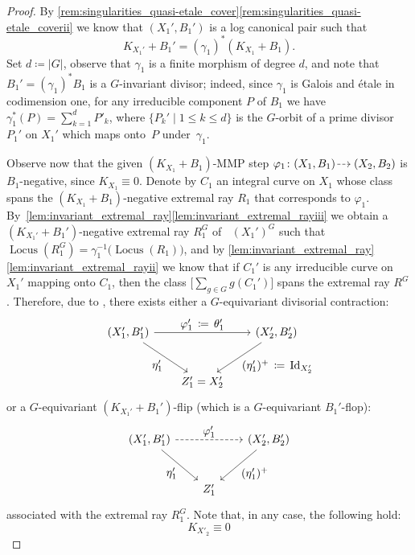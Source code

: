 \documentclass[JEP,XML,SOM,Unicode,published]{cedram}
\let\ts\textstyle
\newcommand{\dradpl}{{\hspace*{-2.5mm}\begin{tikzcd}[ampersand replacement=\&,column sep = scriptsize]\mbox{}\ar[r,dashed]\&\mbox{}\end{tikzcd}\hspace*{-2.5mm}}}
\newcommand{\dratst}{{\hspace*{-2.5mm}\begin{tikzcd}[ampersand replacement=\&,column sep = small]\mbox{}\ar[r,dashed]\&\mbox{}\end{tikzcd}\hspace*{-2mm}}}
\let\drascst\dratst
\newcommand{\dra}{\mathchoice{\dradpl}{\dratst}{\drascst}{\drascst}}
\theoremstyle{plain}
\theoremstyle{definition}
\DeclareMathOperator{\Id}{Id}
\DeclareMathOperator{\Locus}{Locus}
\DeclareMathOperator{\NEb}{\overline{\mathrm{NE}}}
\begin{document}
\begin{proof}
By \autoref{rem:singularities_quasi-etale_cover}\eqref{rem:singularities_quasi-etale_coverii} we know that $(X_1',B_1')$ is a log canonical pair such that
\[
K_{X_1'} + B_1' = (\gamma_1)^* (K_{X_1} + B_1).
\]
Set $d\coloneqq |G|$, observe that $\gamma_1$ is a finite morphism of degree $d$, and note that $B_1' = (\gamma_1)^* B_1$ is a $G$\nobreakdash-invariant divisor; indeed, since $\gamma_1$ is Galois and étale in codimension one, for any irreducible component $P$ of $B_1$ we have $\gamma_1^* (P)=\sum_{k=1}^d P'_k$, where
\hbox{$\bigl\{ P_k' \mid 1 \leq k \leq d \bigr\}$}
is the $G$\nobreakdash-orbit of a prime divisor $P_1'$ on $X_1'$ which maps onto~$P$ under~$\gamma_1$.

Observe now that the given $(K_{X_1}+B_1)$-MMP step $\varphi_1 \colon (X_1,B_1)\dra (X_2,B_2)$ is $B_1$\nobreakdash-negative, since $K_{X_1} \equiv 0$. Denote by $C_1$ an integral curve on $X_1$ whose class spans the $(K_{X_1}+B_1)$-negative extremal ray $R_1$ that corresponds to $\varphi_1$. By~\autoref{lem:invariant_extremal_ray}\eqref{lem:invariant_extremal_rayiii} we obtain a $(K_{X_1'}+B_1')$-negative extremal ray $R_1^G$ of $\NEb(X_1')^G$ such that $\Locus \left(R_1^G \right) = \gamma_1^{-1} \bigl(\Locus(R_1) \bigr)$, and by \autoref{lem:invariant_extremal_ray}\eqref{lem:invariant_extremal_rayii} we know that if $C_1'$ is any irreducible curve on~$X_1'$ mapping onto $C_1$, then the class $\big[ \sum_{g\in G}g(C_1') \big]$ spans the extremal ray $R^G$.
Therefore, due to \cite[Th.\,3.3.1, Th.\,3.3.2 \& Th.\,3.4.2]{Pro21}, there exists either a $G$\nobreakdash-equivariant divisorial contraction:
\[
\begin{tikzcd}[column sep = 2em, row sep = large]
(X_1',B_1') \arrow[dr, "\ts \eta'_1" swap] \arrow[rr, "\ts \varphi'_1 \,\coloneqq \,\theta'_1"] && (X_2',B_2') \arrow[dl, "\ts (\eta_1')^+ \,\coloneqq \,\Id_{X_2'}"] \\
& Z'_1 = X_2'
\end{tikzcd}
\]
or a $G$\nobreakdash-equivariant $(K_{X_1'}+B_1')$-flip (which is a $G$\nobreakdash-equivariant $B_1'$-flop):
\[
\begin{tikzcd}[column sep = 2em, row sep = large]
(X_1',B_1') \arrow[dr, "\ts \eta'_1" swap] \arrow[rr, dashed, "\ts \varphi'_1"] && (X_2',B_2') \arrow[dl, "\ts (\eta_1')^+"] \\
& Z'_1
\end{tikzcd}
\]
associated with the extremal ray $R_1^G$. Note that, in any case, the following hold:
\[
K_{X'_2} \equiv 0
\]
\end{proof}
\end{document}
